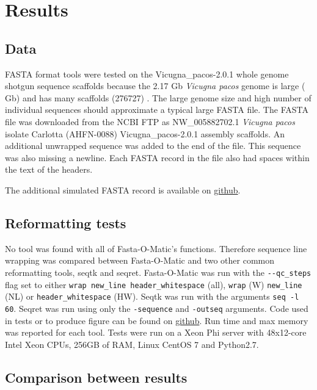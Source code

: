 \section{Results}

\subsection{Data}

FASTA format tools were tested on the Vicugna\_pacos-2.0.1 whole genome shotgun sequence scaffolds because the 2.17 Gb \textit{Vicugna pacos} genome is large ( Gb) and has many scaffolds (276727) \cite{Lindblad_Toh_2011}. The large genome size and high number of individual sequences should approximate a typical large FASTA file. The FASTA file was downloaded from the NCBI FTP as NW\_005882702.1 \textit{Vicugna pacos} isolate Carlotta (AHFN-0088) Vicugna\_pacos-2.0.1 assembly scaffolds.
An additional unwrapped sequence was added to the end of the file. This sequence was also missing a newline. Each FASTA record in the file also had spaces within the text of the headers.

The additional simulated FASTA record is available on \href{https://github.com/kstatebioinfo/Fasta-O-Matic-a-tool-to-sanity-check-and-if-needed-reformat-FASTA-files/blob/master/simulated_unwrapped.fa}{github}.

\subsection{Reformatting tests}
No tool was found with all of Fasta-O-Matic's functions. Therefore sequence line wrapping was compared between Fasta-O-Matic and two other common reformatting tools, seqtk and seqret. Fasta-O-Matic was run with the \verb|--qc_steps| flag set to either \verb|wrap new_line header_whitespace| (all), \verb|wrap| (W) \verb|new_line| (NL) or \verb|header_whitespace| (HW). Seqtk was run with the arguments \verb|seq -l 60|. Seqret was run using only the \verb|-sequence| and \verb|-outseq| arguments. Code used in tests or to produce figure can be found on \href{https://github.com/kstatebioinfo/Fasta-O-Matic-a-tool-to-sanity-check-and-if-needed-reformat-FASTA-files/tree/master/figures}{github}. Run time and max memory was reported for each tool. Tests were run on a Xeon Phi server with 48x12-core Intel Xeon CPUs, 256GB of RAM, Linux CentOS 7 and Python2.7.

\subsection{Comparison between results}

